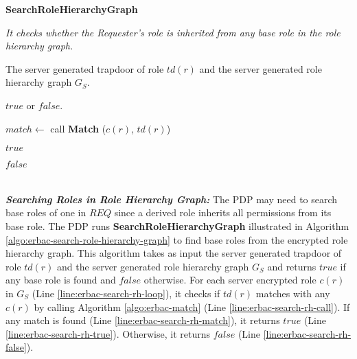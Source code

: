 \documentclass[epsfig,a4paper,11pt,titlepage]{book}
\numberwithin{algorithm}{chapter}
\newcommand{\algofontsize}{\fontsize{11}{12}\selectfont}
\begin{document}
\begin{algorithm} [htp]
{\algofontsize
\caption{\textbf{SearchRoleHierarchyGraph}}

\label{algo:erbac-search-role-hierarchy-graph}

\begin{algorithmic}[1]

\INPUT \emph{It checks whether the Requester's role is inherited from any base role in the role hierarchy graph.}

\Require The server generated trapdoor of role $td(r)$ and the server generated role hierarchy graph $G_{S}$.

\Ensure $\mathit{true}$ or $\mathit{false}$.

\medskip

 \label{line:erbac-search-rh-loop}

	\State $match \leftarrow$ call \textbf{Match} ($c(r)$, $td(r)$) \label{line:erbac-search-rh-call}

	 \label{line:erbac-search-rh-match}
	
		\Return $\mathit{true}$ \label{line:erbac-search-rh-true}
		
	\EndIf

\EndFor

\Return $\mathit{false}$ \label{line:erbac-search-rh-false}

\end{algorithmic}
}
\end{algorithm}

\noindent \\
\noindent \emph{\textbf{Searching Roles in Role Hierarchy Graph:}}
The \gls{PDP} may need to search base roles of one in $\mathit{REQ}$ since a derived role inherits all permissions from its base role. The \gls{PDP} runs \textbf{SearchRoleHierarchyGraph} illustrated in Algorithm \ref{algo:erbac-search-role-hierarchy-graph} to find base roles from the encrypted role hierarchy graph. This algorithm takes as input the server generated trapdoor of role $td(r)$ and the server generated role hierarchy graph $G_{S}$ and returns $\mathit{true}$ if any base role is found and $\mathit{false}$ otherwise. For each server encrypted role $c(r)$ in $G_{S}$ (Line \ref{line:erbac-search-rh-loop}), it checks if $td(r)$ matches with any $c(r)$ by calling Algorithm \ref{algo:erbac-match} (Line \ref{line:erbac-search-rh-call}). If any match is found (Line \ref{line:erbac-search-rh-match}), it returns $\mathit{true}$ (Line \ref{line:erbac-search-rh-true}). Otherwise, it returns $\mathit{false}$ (Line \ref{line:erbac-search-rh-false}).
\end{document}
